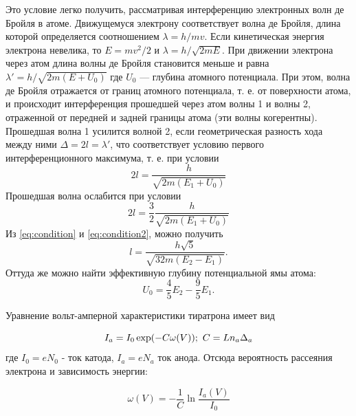\documentclass[a4paper, 12pt]{article}
\begin{document}
Это условие легко получить, рассматривая интерференцию электронных волн де Бройля в атоме. Движущемуся электрону соответствует волна де Бройля, длина которой определяется соотношением $ \lambda = h/m v $. Если кинетическая энергия электрона невелика, то $ E = m v^2/2 $ и $ \lambda = h/\sqrt{2 m E} $. При движении электрона через атом длина волны де Бройля становится меньше и равна $ \lambda' = h/\sqrt{2 m (E+U_0)} $ где $ U_0 $ — глубина атомного потенциала. При этом, волна де Бройля отражается от границ атомного потенциала, т. е. от поверхности атома, и происходит интерференция прошедшей через атом волны 1 и волны 2, отраженной от передней и задней границы атома (эти волны когерентны). Прошедшая волна 1 усилится волной 2, если геометрическая разность хода между ними $ \Delta = 2 l = \lambda' $, что соответствует условию первого интерференционного максимума, т. е. при условии
\begin{equation}\label{eq:condition}
	2 l = \frac{h}{\sqrt{2 m (E_1 + U_0)}}
\end{equation}
Прошедшая волна ослабится при условии
\begin{equation}\label{eq:condition2}
	2 l = \frac{3}{2}\frac{h}{\sqrt{2 m (E_1 + U_0)}}
\end{equation}
Из \eqref{eq:condition} и \eqref{eq:condition2}, можно получить
\begin{equation}\label{eq:radius}
	l = \frac{h \sqrt{5}}{\sqrt{32 m (E_2-E_1)}}.
\end{equation}
Оттуда же можно найти эффективную глубину потенциальной ямы атома:
\begin{equation}\label{eq:atomPit}
	U_0 = \frac{4}{5}E_2-\frac{9}{5} E_1.
\end{equation}

Уравнение вольт-амперной характеристики тиратрона имеет вид

\begin{equation}
	I_a = I_0 \exp (-C \omega(V)) \\; \ C = L n_a \Delta_a
\end{equation}
где $I_0  = eN_0$ - ток катода, $I_a = eN_a$ ток анода. Отсюда вероятность рассеяния электрона и зависимость энергии:

\begin{equation}
	\omega(V) = - \frac{1}{C} \ln \frac{I_a(V)}{I_0}
\end{equation}
\end{document}
